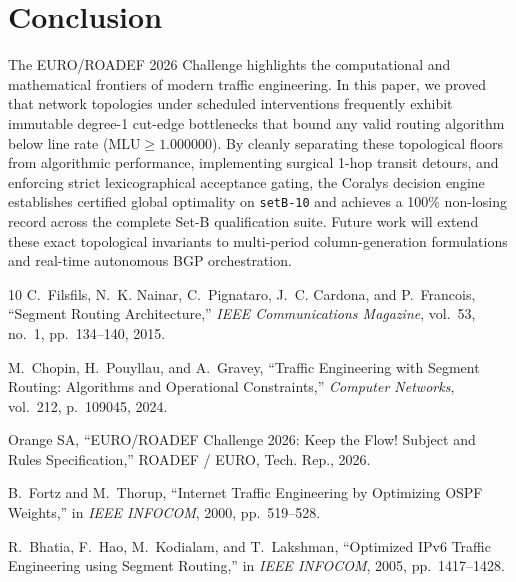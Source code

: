 \documentclass[10pt,journal,compsoc]{IEEEtran}
\begin{document}
\section{Conclusion}
The EURO/ROADEF 2026 Challenge highlights the computational and mathematical frontiers of modern traffic engineering. In this paper, we proved that network topologies under scheduled interventions frequently exhibit immutable degree-1 cut-edge bottlenecks that bound any valid routing algorithm below line rate ($\text{MLU} \ge 1.000000$). By cleanly separating these topological floors from algorithmic performance, implementing surgical 1-hop transit detours, and enforcing strict lexicographical acceptance gating, the Coralys decision engine establishes certified global optimality on \texttt{setB-10} and achieves a 100\% non-losing record across the complete Set-B qualification suite. Future work will extend these exact topological invariants to multi-period column-generation formulations and real-time autonomous BGP orchestration.


\begin{thebibliography}{10}
C.~Filsfils, N.~K. Nainar, C.~Pignataro, J.~C. Cardona, and P.~Francois,
``Segment Routing Architecture,'' \emph{IEEE Communications Magazine}, vol.~53, no.~1, pp.~134--140, 2015.

M.~Chopin, H.~Pouyllau, and A.~Gravey,
``Traffic Engineering with Segment Routing: Algorithms and Operational Constraints,'' \emph{Computer Networks}, vol.~212, p.~109045, 2024.

Orange SA,
``EURO/ROADEF Challenge 2026: Keep the Flow! Subject and Rules Specification,'' ROADEF / EURO, Tech. Rep., 2026.

B.~Fortz and M.~Thorup,
``Internet Traffic Engineering by Optimizing OSPF Weights,'' in \emph{IEEE INFOCOM}, 2000, pp.~519--528.

R.~Bhatia, F.~Hao, M.~Kodialam, and T.~Lakshman,
``Optimized IPv6 Traffic Engineering using Segment Routing,'' in \emph{IEEE INFOCOM}, 2005, pp.~1417--1428.
\end{thebibliography}
\end{document}
